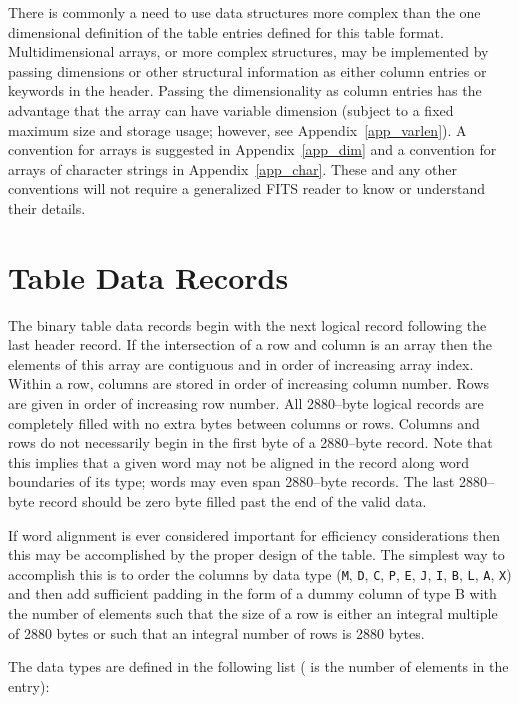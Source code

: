      There is commonly a need to use data structures more complex than
the one dimensional definition of the table entries defined for this
table format.  Multidimensional arrays, or more complex structures,
may be implemented by passing dimensions or other structural
information as either column entries or keywords in the header.
Passing the dimensionality as column entries has the advantage that
the array can have variable dimension (subject to a fixed maximum size
and storage usage; however, see Appendix~\ref{app_varlen}).  A
convention for arrays is suggested in Appendix~\ref{app_dim} and a
convention for arrays of character strings in Appendix~\ref{app_char}.
These and any other conventions will not require a generalized FITS
reader to know or understand their details.

\section{Table Data Records}\label{sect_datatypes}

The binary table data records begin with the next logical record
following the last header record. If the intersection of a row and
column is an array then the elements of this array are contiguous and
in order of increasing array index.  Within a row, columns are stored
in order of increasing column number.  Rows are given in order of
increasing row number.  All 2880--byte logical records are completely
filled with no extra bytes between columns or rows.  Columns and rows
do not necessarily begin in the first byte of a 2880--byte record.
Note that this implies that a given word may not be aligned in the
record along word boundaries of its type; words may even span
2880--byte records.  The last 2880--byte record should be zero byte
filled past the end of the valid data.

   If word alignment is ever considered important for efficiency
considerations then this may be accomplished by the proper design of
the table.  The simplest way to accomplish this is to order the
columns by data type (\verb|M|, \verb|D|, \verb|C|, \verb|P|,
\verb|E|, \verb|J|, \verb|I|, \verb|B|, \verb|L|, \verb|A|, \verb|X|)
and then add sufficient padding in the form of a dummy column of type
B with the number of elements such that the size of a row is either an
integral multiple of 2880 bytes or such that an integral number of rows is
2880 bytes.

The data types are defined in the following list ( is the
number of elements in the entry):

